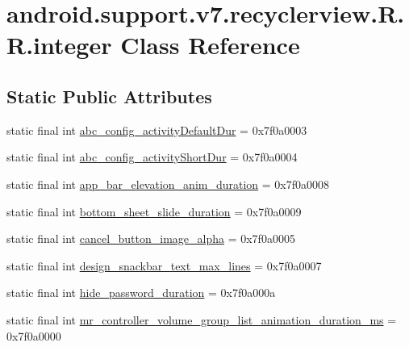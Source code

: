 \hypertarget{classandroid_1_1support_1_1v7_1_1recyclerview_1_1_r_1_1integer}{
\section{android.support.v7.recyclerview.R.R.integer Class Reference}
\label{classandroid_1_1support_1_1v7_1_1recyclerview_1_1_r_1_1integer}
}
\subsection*{Static Public Attributes}
\begin{CompactItemize}
\item 
static final int \hyperlink{classandroid_1_1support_1_1v7_1_1recyclerview_1_1_r_1_1integer_e1f10eedfab31a36c59bee2bc1a3ec7c}{abc\_\-config\_\-activityDefaultDur} = 0x7f0a0003
\item 
static final int \hyperlink{classandroid_1_1support_1_1v7_1_1recyclerview_1_1_r_1_1integer_3944934b31b2147dac1a5c537ce167b3}{abc\_\-config\_\-activityShortDur} = 0x7f0a0004
\item 
static final int \hyperlink{classandroid_1_1support_1_1v7_1_1recyclerview_1_1_r_1_1integer_5cc65ace208c39220b870d4bef2e2931}{app\_\-bar\_\-elevation\_\-anim\_\-duration} = 0x7f0a0008
\item 
static final int \hyperlink{classandroid_1_1support_1_1v7_1_1recyclerview_1_1_r_1_1integer_e0e6fe1674e3e55d486ee141edb9dee4}{bottom\_\-sheet\_\-slide\_\-duration} = 0x7f0a0009
\item 
static final int \hyperlink{classandroid_1_1support_1_1v7_1_1recyclerview_1_1_r_1_1integer_5cad82b0badf3d3fe1f4c11d2fd7a5e7}{cancel\_\-button\_\-image\_\-alpha} = 0x7f0a0005
\item 
static final int \hyperlink{classandroid_1_1support_1_1v7_1_1recyclerview_1_1_r_1_1integer_5cb568ea374ba91dd9bde843362d8269}{design\_\-snackbar\_\-text\_\-max\_\-lines} = 0x7f0a0007
\item 
static final int \hyperlink{classandroid_1_1support_1_1v7_1_1recyclerview_1_1_r_1_1integer_75ba7d4cfe059ab8adb40388c3519585}{hide\_\-password\_\-duration} = 0x7f0a000a
\item 
static final int \hyperlink{classandroid_1_1support_1_1v7_1_1recyclerview_1_1_r_1_1integer_252e1e1197836cd50bf7bd27c5fc182c}{mr\_\-controller\_\-volume\_\-group\_\-list\_\-animation\_\-duration\_\-ms} = 0x7f0a0000
\item 

\end{CompactItemize}

